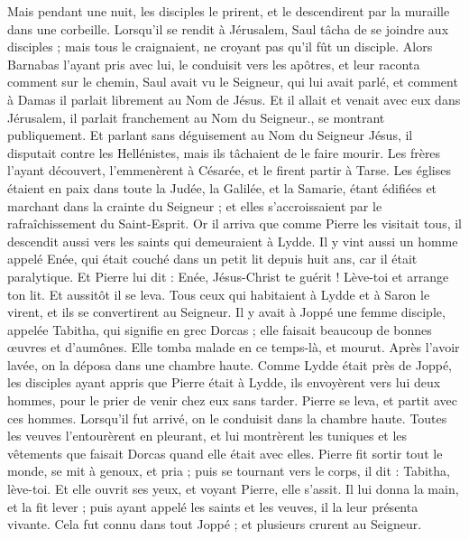 \begin{multicols}{2}
{Mais pendant une nuit, les disciples le prirent, et le descendirent par la muraille dans une corbeille.
Lorsqu'il se rendit à Jérusalem, Saul tâcha de se joindre aux disciples ; mais tous le craignaient, ne croyant pas qu'il fût un disciple.
Alors Barnabas l'ayant pris avec lui, le conduisit vers les apôtres, et leur raconta comment sur le chemin, Saul avait vu le Seigneur, qui lui avait parlé, et comment à Damas il parlait librement au Nom de Jésus.
Et il allait et venait avec eux dans Jérusalem, il parlait franchement au Nom du Seigneur., se montrant publiquement.
Et parlant sans déguisement au Nom du Seigneur Jésus, il disputait contre les Hellénistes, mais ils tâchaient de le faire mourir.
Les frères l'ayant découvert, l'emmenèrent à Césarée, et le firent partir à Tarse.
Les églises étaient en paix dans toute la Judée, la Galilée, et la Samarie, étant édifiées et marchant dans la crainte du Seigneur ; et elles s'accroissaient par le rafraîchissement du Saint-Esprit.
Or il arriva que comme Pierre les visitait tous, il descendit aussi vers les saints qui demeuraient à Lydde.
Il y vint aussi un homme appelé Enée, qui était couché dans un petit lit depuis huit ans, car il était paralytique.
Et Pierre lui dit : Enée, Jésus-Christ te guérit ! Lève-toi et arrange ton lit. Et aussitôt il se leva.
Tous ceux qui habitaient à Lydde et à Saron le virent, et ils se convertirent au Seigneur.
Il y avait à Joppé une femme disciple, appelée Tabitha, qui signifie en grec Dorcas ; elle faisait beaucoup de bonnes œuvres et d'aumônes.
Elle tomba malade en ce temps-là, et mourut. Après l'avoir lavée, on la déposa dans une chambre haute.
Comme Lydde était près de Joppé, les disciples ayant appris que Pierre était à Lydde, ils envoyèrent vers lui deux hommes, pour le prier de venir chez eux sans tarder.
Pierre se leva, et partit avec ces hommes. Lorsqu'il fut arrivé, on le conduisit dans la chambre haute. Toutes les veuves l'entourèrent en pleurant, et lui montrèrent les tuniques et les vêtements que faisait Dorcas quand elle était avec elles.
Pierre fit sortir tout le monde, se mit à genoux, et pria ; puis se tournant vers le corps, il dit : Tabitha, lève-toi. Et elle ouvrit ses yeux, et voyant Pierre, elle s'assit.
Il lui donna la main, et la fit lever ; puis ayant appelé les saints et les veuves, il la leur présenta vivante.
Cela fut connu dans tout Joppé ; et plusieurs crurent au Seigneur.
}
\end{multicols}
